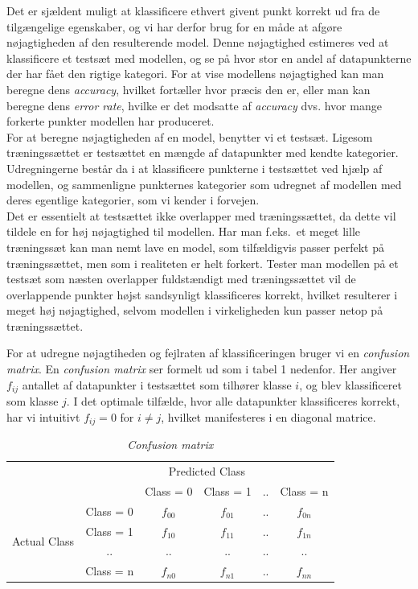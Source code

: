\documentclass{article}
\begin{document}
Det er sjældent muligt at klassificere ethvert givent punkt korrekt ud fra de tilgængelige egenskaber, og vi har derfor brug for en måde at afgøre nøjagtigheden af den resulterende model. Denne nøjagtighed estimeres ved at klassificere et testsæt med modellen, og se på hvor stor en andel af datapunkterne der har fået den rigtige kategori. For at vise modellens nøjagtighed kan man beregne dens \textit{accuracy}, hvilket fortæller hvor præcis den er, eller man kan beregne dens \textit{error rate}, hvilke er det modsatte af \textit{accuracy} dvs. hvor mange forkerte punkter modellen har produceret.\\
For at beregne nøjagtigheden af en model, benytter vi et testsæt. Ligesom træningssættet er testsættet en mængde af datapunkter med kendte kategorier. Udregningerne består da i at klassificere punkterne i testsættet ved hjælp af modellen, og sammenligne punkternes kategorier som udregnet af modellen med deres egentlige kategorier, som vi kender i forvejen.\\
Det er essentielt at testsættet ikke overlapper med træningssættet, da dette vil tildele en for høj nøjagtighed til modellen. Har man f.eks.\ et meget lille træningssæt kan man nemt lave en model, som tilfældigvis passer perfekt på træningssættet, men som i realiteten er helt forkert. Tester man modellen på et testsæt som næsten overlapper fuldstændigt med træningssættet vil de overlappende punkter højst sandsynligt klassificeres korrekt, hvilket resulterer i meget høj nøjagtighed, selvom modellen i virkeligheden kun passer netop på træningssættet. 

For at udregne nøjagtiheden og fejlraten af klassificeringen bruger vi en \textit{confusion matrix}. En \textit{confusion matrix} ser formelt ud som i tabel 1 nedenfor. Her angiver $f_{ij}$ antallet af datapunkter i testsættet som tilhører klasse $i$, og blev klassificeret som klasse $j$. I det optimale tilfælde, hvor alle datapunkter klassificeres korrekt, har vi intuitivt $f_{ij}=0$ for $i\neq j$, hvilket manifesteres i en diagonal matrice.\\

\begin{table}[H]
\begin{center}
\begin{tabular}{cc|c|c|c|c|}
    & \multicolumn{5}{c}{Predicted Class} \\
    \cline{3-6}
     & & Class = 0 & Class = 1 & .. & Class = n \\
    \cline{2-6}
    \multicolumn{1}{c|}{\multirow{4}{*}{Actual Class}} & Class = 0 & $f_{00}$ & $f_{01}$ & .. & $f_{0n}$ \\
    \cline{2-6}
    \multicolumn{1}{c|}{} & Class = 1 & $f_{10}$ & $f_{11}$ & .. & $f_{1n}$ \\
    \cline{2-6}
    \multicolumn{1}{c|}{} & .. & .. & .. & .. & .. \\
    \cline{2-6}
    \multicolumn{1}{c|}{} & Class = n & $f_{n0}$ & $f_{n1}$ & .. & $f_{nn}$ \\
    \cline{2-6}
\end{tabular}
\caption{\textit{Confusion matrix}}
\end{center}
\end{table}
\end{document}
